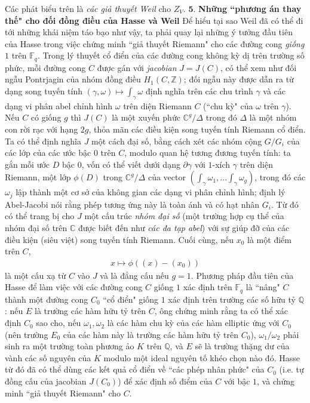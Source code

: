\begin{multicols}{2}
	\vskip 0.1cm
	Các phát biểu trên là \textit{các giả thuyết Weil} cho $Z_V$.
	\vskip 0.1cm
	$\pmb{5.}$ \textbf{\color{duongvaotoanhoc}Những ``phương án thay thế" cho đối đồng điều của Hasse và Weil} 
	\vskip 0.1cm
	Để hiểu tại sao Weil đã có thể đi tới những khái niệm táo bạo như vậy, ta phải quay lại những ý tưởng đầu tiên của Hasse trong việc chứng minh ``giả thuyết Riemann" cho các đường cong \textit{giống} $1$ trên $\mathbb{F}_q$. Trong lý thuyết cổ điển của các đường cong không kỳ dị trên trường số phức, mỗi đường cong $C$ được gán với \textit{jacobian} $J = J(C)$, có thể xem như đối ngẫu Pontrjagin của nhóm đồng điều $H_1(C,\mathbb{Z})$; đối ngẫu này được dẫn ra từ dạng song tuyến tính $(\gamma,\omega) \mapsto \int_{\gamma}\omega$ định nghĩa trên các chu trình $\gamma$ và các dạng vi phân abel chỉnh hình $\omega$ trên diện Riemann $C$ (``chu kỳ" của $\omega$ trên $\gamma$). Nếu $C$ có giống $g$ thì $J(C)$ là một xuyến phức $\mathbb{C}^g/\Delta$ trong đó $\Delta$ là một nhóm con rời rạc với hạng $2g$, thỏa mãn các điều kiện song tuyến tính Riemann cổ điển. Ta có thể định nghĩa $J$ một cách đại số, bằng cách xét các nhóm cộng $G/G_i$ của các lớp của các ước bậc $0$ trên $C$, modulo quan hệ tương đương tuyến tính: ta gắn mỗi ước $D$ bậc $0$, vốn có thể viết dưới dạng $\partial \gamma$ với $1$-xích $\gamma$ trên diện Riemann, một lớp $\phi(D)$ trong $\mathbb{C}^g/\Delta$ của vector $\left(\int_{\gamma}\omega_1,...\int_{\gamma}\omega_g\right)$, trong đó các $\omega_j$ lập thành một cơ sở của không gian các dạng vi phân chỉnh hình; định lý Abel-Jacobi nói rằng phép tương ứng này là toàn ánh và có hạt nhân $G_i$. Từ đó có thể trang bị cho $J$ một cấu trúc \textit{nhóm đại số} (một trường hợp cụ thể của nhóm đại số trên $\mathbb{C}$ được biết đến như \textit{các đa tạp abel}) với sự giúp đỡ của các điều kiện (siêu việt) song tuyến tính Riemann. Cuối cùng, nếu $x_0$ là một điểm trên $C$,
	\begin{align*}
		x \mapsto \phi((x) - (x_0))
	\end{align*}
	là một cấu xạ từ $C$ vào $J$ và là đẳng cấu nếu $g=1$.
	\vskip 0.1cm
	Phương pháp đầu tiên của Hasse để làm việc với các đường cong $C$ giống $1$ xác định trên $\mathbb{F}_q$ là ``nâng" $C$ thành một đường cong $C_0$ ``cổ điển" giống $1$ xác định trên trường các số hữu tỷ $\mathbb{Q}$: nếu $E$ là trường các hàm hữu tỷ trên $C$, ông chứng minh rằng ta có thể xác định $C_0$ sao cho, nếu $\omega_1,\omega_2$ là các hàm chu kỳ của các hàm elliptic ứng với $C_0$ (nên trường $E_0$ của các hàm này là trường các hàm hữu tỷ trên $C_0$), $\omega_1/\omega_2$ phải sinh ra một trường toàn phương ảo $K$ trên $\mathbb{Q}$, và $E$ sẽ là trường thặng dư của vành các số nguyên của $K$ modulo một ideal nguyên tố khéo chọn nào đó. Hasse từ đó đã có thể dùng các kết quả cổ điển về ``các phép nhân phức" của $C_0$ (i.e. tự đồng cấu của jacobian $J(C_0)$) để xác định số điểm của $C$ với bậc $1$, và chứng minh ``giả thuyết Riemann" cho $C$.

\end{multicols}
